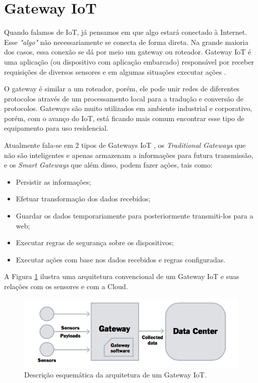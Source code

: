 \section{Gateway IoT}
\label{sec:iotGateway}

Quando falamos de IoT, já pensamos em que algo estará conectado à Internet. Esse \textit{"algo"} não necessariamente se conecta de forma direta. Na grande maioria dos casos, essa conexão se dá por meio um gateway ou roteador. Gateway IoT é uma aplicação (ou dispositivo com aplicação embarcado) responsável por receber requisições de diversos sensores e em algumas situações executar ações \cite{ChenJiaLi}. 

O gateway é similar a um roteador, porém, ele pode unir redes de diferentes protocolos através de um processamento local para a tradução e conversão de protocolos. Gateways são muito utilizados em ambiente industrial e corporativo, porém, com o avanço do IoT, está ficando mais comum encontrar esse tipo de equipamento para uso residencial.

Atualmente fala-se em 2 tipos de Gateways IoT \cite{WhatIsIotGateway}, os \textit{Traditional Gateways} que não são inteligentes e apenas armazenam a informações para futura transmissão, e os \textit{Smart Gateways} que além disso, podem fazer ações, tais como:
\begin{itemize}
	\item Persistir as informações;
	\item Efetuar transformação dos dados recebidos;
	\item Guardar os dados temporariamente para posteriormente transmiti-los para a web;
	\item Executar regras de segurança sobre os dispositivos;
	\item Executar ações com base nos dados recebidos e regras configuradas.
\end{itemize}

A Figura \ref{fig:arquiteturaIotGateway} ilustra uma arquitetura convencional de um Gateway IoT e suas relações com os sensores e com a Cloud.
\begin{figure}[h!]
	\begin{center}
		\includegraphics[width=1\textwidth]{./img/rumFxS7.png}
		\caption{Descrição esquemática da arquitetura de um Gateway IoT.}
		\label{fig:arquiteturaIotGateway}
	\end{center}
\end{figure}


